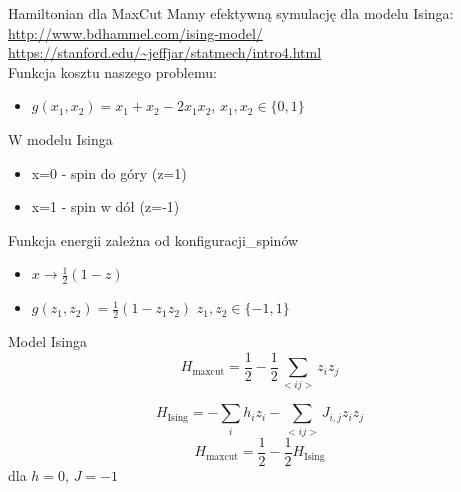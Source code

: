 \begin{frame}{Hamiltonian dla MaxCut}
Mamy efektywną symulację dla modelu Isinga:
\url{http://www.bdhammel.com/ising-model/}
  \url{https://stanford.edu/~jeffjar/statmech/intro4.html} \\
  Funkcja kosztu naszego problemu:
    \begin{itemize}
        \item[] $g(x_1, x_2)=x_1+x_2-2x_1 x_2$, $x_1,x_2 \in\{0,1\}$
       \end{itemize}
W modelu Isinga
       \begin{itemize}
           \item  x=0 - spin do góry (z=1)
           \item  x=1 - spin w dół (z=-1)
       \end{itemize}
    
Funkcja energii zależna od konfiguracji\_spinów     
       \begin{itemize}
        \item[] $x\rightarrow \frac{1}{2}(1-z)$  
        \item[] $g(z_1,z_2)=\frac{1}{2}(1-z_1z_2)$ $z_1,z_2 \in\{-1,1\}$
   \end{itemize}     
\end{frame}
\begin{frame}{Model Isinga}
$$ H_{\text{maxcut}}=\frac{1}{2}  - \frac{1}{2} \sum_{<ij>} {z_{i}} {z_{j}}$$

$$ H_{\text{Ising}}=- \sum_{i} h_i z_i - \sum_{<ij>} J_{i,j} z_{i} z_{j}
$$
$$H_{\text{maxcut}}=\frac{1}{2} - \frac{1}{2} H_{\text{Ising}}$$
dla $h=0$, $J=-1$\\

\end{frame}%

